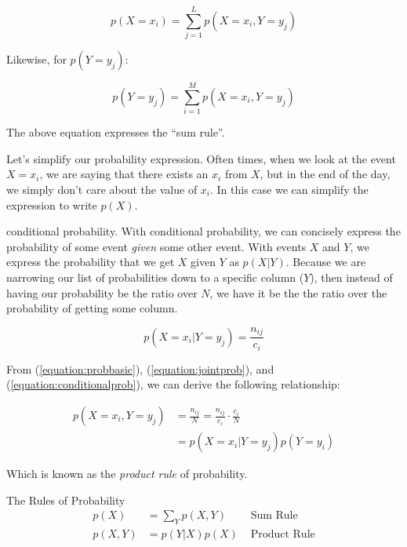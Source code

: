 \documentclass{tufte-handout}
\begin{document}
\begin{equation}
  p(X = x_i) = \sum\limits_{j = 1}^Lp(X = x_i, Y = y_j)
\end{equation}

Likewise, for $p(Y = y_j)$:

\begin{equation}
  p(Y = y_j) = \sum\limits_{i = 1}^Mp(X = x_i, Y = y_j)
\end{equation}


The above equation expresses the ``sum rule''.

Let's simplify our probability expression. Often times, when we look at the event $X = x_i$, we are saying that there exists an $x_i$ from $X$, but in the end of the day, we simply don't care about the value of $x_i$. In this case we can simplify the expression to write $p(X)$.

 conditional probability. With conditional probability, we can concisely express the probability of some event \emph{given} some other event. With events $X$ and $Y$, we express the probability that we
get $X$ given $Y$ as $p(X|Y)$. Because we are narrowing our list of
probabilities down to a specific column ($Y$), then instead of having our
probability be the ratio over $N$, we have it be the the ratio over the
probability of getting some column.

\begin{equation} \label{equation:conditionalprob}
  p(X = x_i | Y = y_j) = \frac{n_{ij}}{c_i}
\end{equation}

From (\ref{equation:probbasic}), (\ref{equation:jointprob}), and
(\ref{equation:conditionalprob}), we can derive the following relationship:

\begin{equation}
  \begin{aligned}
    p(X = x_i , Y = y_j) &= \frac{n_{ij}}{N} = \frac{n_{ij}}{c_i} \cdot \frac{c_i}{N} \\
                         & = p(X = x_i | Y = y_j)p(Y = y_i)
  \end{aligned}
\end{equation}

Which is known as the \emph{product rule} of probability.

\begin{tcolorbox}
  The Rules of Probability
  \begin{align}
    p(X) &= \sum\limits_{Y}p(X, Y) & \text{    Sum Rule} \label{equation:sumrule}\\
    p(X, Y) &= p(Y|X)p(X) & \text{    Product Rule} \label{equation:productrule}
  \end{align}
\end{tcolorbox}
\end{document}
